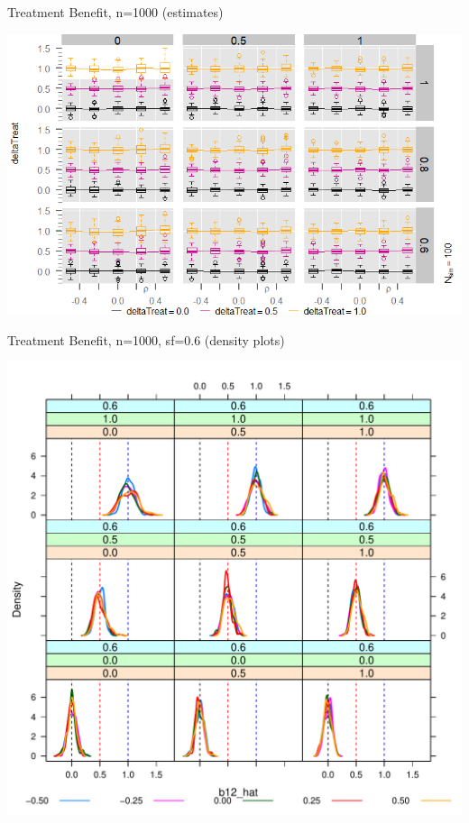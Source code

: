 \begin{frame}{Treatment Benefit, n=1000 (estimates)}

\begin{center}
  \includegraphics[width=1.00\textwidth]{Figure3/mayplot3-deltaTreat-n1000.png}
\end{center}

\end{frame}

\begin{frame}{Treatment Benefit, n=1000, sf=0.6 (density plots)}

\begin{center}
  \includegraphics[scale=0.45]{Figure3/tbl3DensityPlots_n1000_003.pdf} %
\end{center}

\end{frame}


